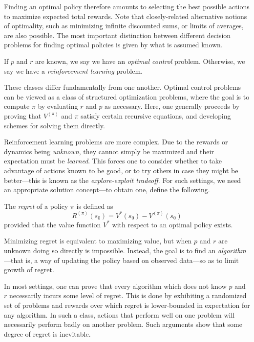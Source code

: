 \documentclass[11pt]{book}
\begin{document}
Finding an optimal policy therefore amounts to selecting the best possible actions to maximize expected total rewards.
Note that closely-related alternative notions of optimality, such as minimizing infinite discounted sums, or limits of averages, are also possible.
The most important distinction between different decision problems for finding optimal policies is given by what is assumed known.

\1 If $p$ and $r$ are known, we say we have an \emph{optimal control} problem.
\2 Otherwise, we say we have a \emph{reinforcement learning} problem.
\0 

These classes differ fundamentally from one another. 
Optimal control problems can be viewed as a class of structured optimization problems, where the goal is to compute $\pi$ by evaluating $r$ and $p$ as necessary.
Here, one generally proceeds by proving that $V^{(\pi)}$ and $\pi$ satisfy certain recursive equations, and developing schemes for solving them directly.

Reinforcement learning problems are more complex.
Due to the rewards or dynamics being \emph{unknown}, they cannot simply be maximized and their expectation must be \emph{learned}.
This forces one to consider whether to take advantage of actions known to be good, or to try others in case they might be better---this is known as the \emph{explore-exploit tradeoff}.
For such settings, we need an appropriate solution concept---to obtain one, define the following.

\begin{definition}[Regret]
The \emph{regret} of a policy $\pi$ is defined as 
\[
R^{(\pi)}(s_0) = V^*(s_0) - V^{(\pi)}(s_0)
\]
provided that the value function $V^*$ with respect to an optimal policy exists.
\end{definition}

Minimizing regret is equivalent to maximizing value, but when $p$ and $r$ are unknown doing so directly is impossible.
Instead, the goal is to find an \emph{algorithm}---that is, a way of updating the policy based on observed data---so as to limit growth of regret.

In most settings, one can prove that every algorithm which does not know $p$ and $r$ necessarily incurs some level of regret.
This is done by exhibiting a randomized set of problems and rewards over which regret is lower-bounded in expectation for any algorithm.
In such a class, actions that perform well on one problem will necessarily perform badly on another problem.
Such arguments show that some degree of regret is inevitable.
\end{document}
